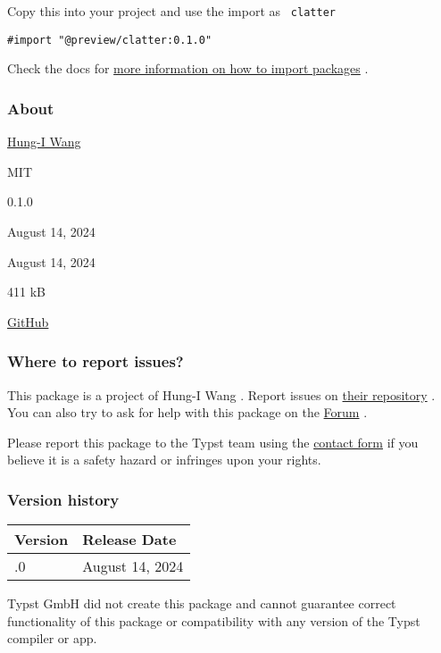 Copy this into your project and use the import as \texttt{\ clatter\ }

\begin{verbatim}
#import "@preview/clatter:0.1.0"
\end{verbatim}



Check the docs for
\href{https://typst.app/docs/reference/scripting/\#packages}{more
information on how to import packages} .

\subsubsection{About}\label{about}

\begin{description}
\tightlist
\item[Author :]
\href{mailto:whygowe@gmail.com}{Hung-I Wang}
\item[License:]
MIT
\item[Current version:]
0.1.0
\item[Last updated:]
August 14, 2024
\item[First released:]
August 14, 2024
\item[Archive size:]
411 kB
\href{https://packages.typst.org/preview/clatter-0.1.0.tar.gz}{\pandocbounded{}}
\item[Repository:]
\href{https://github.com/Gowee/typst-clatter}{GitHub}
\end{description}

\subsubsection{Where to report issues?}\label{where-to-report-issues}

This package is a project of Hung-I Wang . Report issues on
\href{https://github.com/Gowee/typst-clatter}{their repository} . You
can also try to ask for help with this package on the
\href{https://forum.typst.app}{Forum} .

Please report this package to the Typst team using the
\href{https://typst.app/contact}{contact form} if you believe it is a
safety hazard or infringes upon your rights.

\label{versions}
\subsubsection{Version history}\label{version-history}

\begin{longtable}[]{@{}ll@{}}
\toprule\noalign{}
Version & Release Date \\
\midrule\noalign{}
\endhead
\bottomrule\noalign{}
\endlastfoot
0.1.0 & August 14, 2024 \\
\end{longtable}

Typst GmbH did not create this package and cannot guarantee correct
functionality of this package or compatibility with any version of the
Typst compiler or app.

